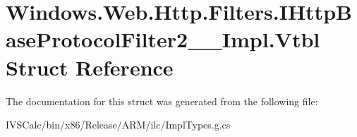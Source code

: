 \hypertarget{struct_windows_1_1_web_1_1_http_1_1_filters_1_1_i_http_base_protocol_filter2_____impl_1_1_vtbl}{}\section{Windows.\+Web.\+Http.\+Filters.\+I\+Http\+Base\+Protocol\+Filter2\+\_\+\+\_\+\+Impl.\+Vtbl Struct Reference}
\label{struct_windows_1_1_web_1_1_http_1_1_filters_1_1_i_http_base_protocol_filter2_____impl_1_1_vtbl}


The documentation for this struct was generated from the following file\+:\begin{DoxyCompactItemize}
\item 
I\+V\+S\+Calc/bin/x86/\+Release/\+A\+R\+M/ilc/Impl\+Types.\+g.\+cs\end{DoxyCompactItemize}
